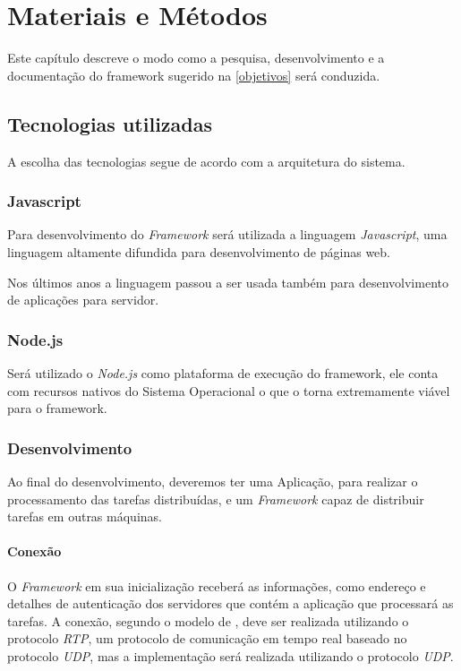 
\chapter{Materiais e Métodos}
\label{metodologia}
Este capítulo descreve o modo como a pesquisa, desenvolvimento e a documentação
do framework sugerido na \autoref{objetivos} será conduzida.

\section{Tecnologias utilizadas}
A escolha das tecnologias segue de acordo com a arquitetura do sistema.

\subsection{Javascript}
Para desenvolvimento do \emph{Framework} será utilizada a linguagem \emph{Javascript},
uma linguagem altamente difundida para desenvolvimento de páginas web.

Nos últimos anos a linguagem passou a ser usada também para desenvolvimento de
aplicações para servidor.


\subsection{Node.js}
Será utilizado o \emph{Node.js} como plataforma de execução do framework, ele
conta com recursos nativos do Sistema Operacional o que o torna extremamente
viável para o framework.


\subsection{Desenvolvimento}
Ao final do desenvolvimento, deveremos ter uma Aplicação, para realizar o
processamento das tarefas distribuídas, e um \emph{Framework} capaz de distribuir
tarefas em outras máquinas.


\subsubsection{Conexão}
O \emph{Framework} em sua inicialização receberá as informações, como
endere\c{c}o e detalhes de autenticação dos servidores que contém a aplicação que
processará as tarefas. A conexão, segundo o modelo de ,
deve ser realizada utilizando o protocolo \emph{RTP}, um protocolo de
comunicação em tempo real baseado no protocolo \emph{UDP}, mas a implementação
será realizada utilizando o protocolo \emph{UDP}.


